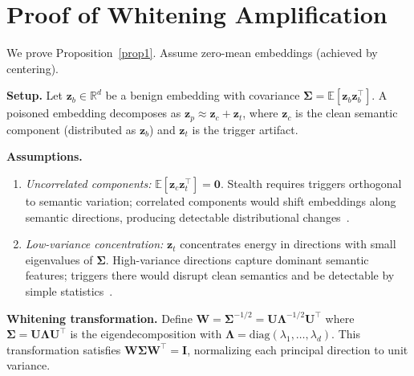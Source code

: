 \documentclass[letterpaper,twocolumn,10pt]{article}
\newcommand{\mn}[1]{\textcolor{orange!90!black}{Mahmoud: #1}}
\begin{document}



\appendix


\section{Proof of Whitening Amplification}
\label{appendix:proof}

We prove Proposition~\ref{prop1}. Assume zero-mean embeddings (achieved by centering).

\par \textbf{Setup.} Let $\mathbf{z}_b \in \mathbb{R}^d$ be a benign embedding with covariance $\bm{\Sigma} = \mathbb{E}[\mathbf{z}_b \mathbf{z}_b^\top]$. A poisoned embedding decomposes as $\mathbf{z}_p \approx \mathbf{z}_c + \mathbf{z}_t$, where $\mathbf{z}_c$ is the clean semantic component (distributed as $\mathbf{z}_b$) and $\mathbf{z}_t$ is the trigger artifact. 

\par \textbf{Assumptions.}
\begin{enumerate}[label=(A\arabic*), leftmargin=*, topsep=2pt, itemsep=1pt]
    \item \textit{Uncorrelated components:} $\mathbb{E}[\mathbf{z}_c \mathbf{z}_t^\top] = \mathbf{0}$. Stealth requires triggers orthogonal to semantic variation; correlated components would shift embeddings along semantic directions, producing detectable distributional changes~\cite{tao2024distribution,zhang2025invisible}.
    \item \textit{Low-variance concentration:} $\mathbf{z}_t$ concentrates energy in directions with small eigenvalues of $\bm{\Sigma}$. High-variance directions capture dominant semantic features; triggers there would disrupt clean semantics and be detectable by simple statistics~\cite{tran2018spectral}.
\end{enumerate}

\par \textbf{Whitening transformation.} Define $\mathbf{W} = \bm{\Sigma}^{-1/2} = \mathbf{U}\bm{\Lambda}^{-1/2}\mathbf{U}^\top$ where $\bm{\Sigma} = \mathbf{U}\bm{\Lambda} \mathbf{U}^\top$ is the eigendecomposition with $\bm{\Lambda} = \mathrm{diag}(\lambda_1, \ldots, \lambda_d)$. This transformation satisfies $\mathbf{W}\bm{\Sigma} \mathbf{W}^\top = \mathbf{I}$, normalizing each principal direction to unit variance.
\end{document}
